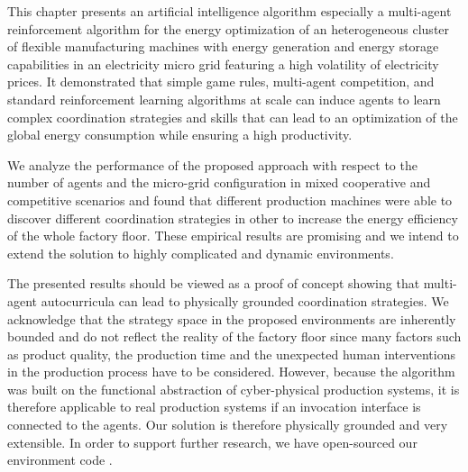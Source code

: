 This chapter presents an artificial intelligence algorithm especially a multi-agent reinforcement algorithm for the energy optimization of an heterogeneous cluster of flexible manufacturing machines with energy generation and energy storage capabilities in an electricity micro grid featuring a high volatility of electricity prices. It demonstrated that simple game rules, multi-agent competition, and standard reinforcement learning algorithms at scale can induce agents to learn complex coordination strategies and skills that can lead to an optimization of the global energy consumption while ensuring a high productivity. 

We analyze the performance of the proposed approach with respect to the number of agents and the micro-grid configuration in mixed cooperative and competitive scenarios and found that different production machines were able to discover different coordination strategies in other to increase the energy efficiency of the whole factory floor. These empirical results are promising and we intend to extend the solution to highly complicated and dynamic environments.

The presented results should be viewed as a proof of concept showing that multi-agent autocurricula can lead to physically grounded coordination strategies. We acknowledge that the strategy space in the proposed environments are inherently bounded and do not reflect the reality of the factory floor since many factors such as product quality, the production time and the unexpected human interventions in the production process have to be considered. However, because the algorithm was built on the functional abstraction of cyber-physical production systems, it is therefore applicable to real production systems if an invocation interface is connected to the agents. Our solution is therefore physically grounded and very extensible. In order to support further research, we have open-sourced our environment code \cite{Bakakeu2019}.
